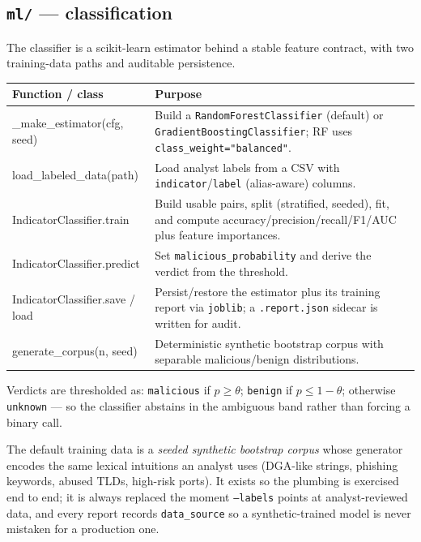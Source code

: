 \documentclass[11pt,a4paper]{article}
\newcommand{\code}[1]{\texttt{\small #1}}
\begin{document}
\subsection{\code{ml/} --- classification}
The classifier is a scikit-learn estimator behind a stable feature contract,
with two training-data paths and auditable persistence.

\begin{center}
\begin{tabularx}{\linewidth}{@{}>{\ttfamily\small}p{4.6cm}X@{}}
\toprule
\rowcolor{paper}\textbf{Function / class} & \textbf{Purpose} \\
\midrule
\_make\_estimator(cfg, seed) & Build a \code{RandomForestClassifier} (default) or \code{GradientBoostingClassifier}; RF uses \code{class\_weight="balanced"}. \\
load\_labeled\_data(path) & Load analyst labels from a CSV with \code{indicator}/\code{label} (alias-aware) columns. \\
IndicatorClassifier.train & Build usable pairs, split (stratified, seeded), fit, and compute accuracy/precision/recall/F1/AUC plus feature importances. \\
IndicatorClassifier.predict & Set \code{malicious\_probability} and derive the verdict from the threshold. \\
IndicatorClassifier.save / load & Persist/restore the estimator plus its training report via \code{joblib}; a \code{.report.json} sidecar is written for audit. \\
generate\_corpus(n, seed) & Deterministic synthetic bootstrap corpus with separable malicious/benign distributions. \\
\bottomrule
\end{tabularx}
\end{center}

Verdicts are thresholded as: \code{malicious} if $p \ge \theta$; \code{benign} if
$p \le 1-\theta$; otherwise \code{unknown} --- so the classifier abstains in the
ambiguous band rather than forcing a binary call.

\begin{notebox}
The default training data is a \emph{seeded synthetic bootstrap corpus} whose
generator encodes the same lexical intuitions an analyst uses (DGA-like strings,
phishing keywords, abused TLDs, high-risk ports). It exists so the plumbing is
exercised end to end; it is always replaced the moment \code{--labels} points at
analyst-reviewed data, and every report records \code{data\_source} so a
synthetic-trained model is never mistaken for a production one.
\end{notebox}
\end{document}
